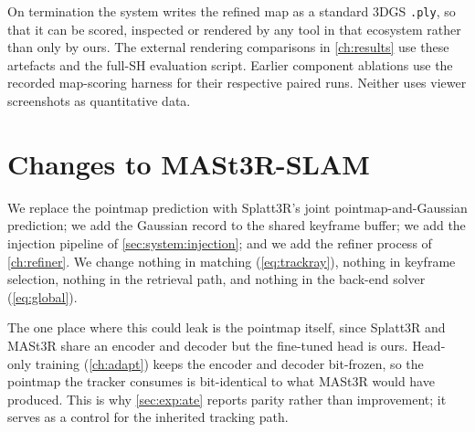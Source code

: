 On termination the system writes the refined map as a standard 3DGS
\texttt{.ply}, so that it can be scored, inspected or rendered by any tool in
that ecosystem rather than only by ours. The external rendering comparisons
in \cref{ch:results} use these artefacts and the full-SH evaluation script.
Earlier component ablations use the recorded map-scoring harness for their
respective paired runs. Neither uses viewer screenshots as quantitative data.

\section{Changes to MASt3R-SLAM}
\label{sec:system:diff}

We replace the pointmap
prediction with Splatt3R's joint pointmap-and-Gaussian prediction; we add the
Gaussian record to the shared keyframe buffer; we add the injection pipeline
of \cref{sec:system:injection}; and we add the refiner process of
\cref{ch:refiner}. We change nothing in matching (\cref{eq:trackray}), nothing
in keyframe selection, nothing in the retrieval path, and nothing in the
back-end solver (\cref{eq:global}).

The one place where this could leak is the pointmap itself, since Splatt3R and
MASt3R share an encoder and decoder but the fine-tuned head is ours. Head-only
training (\cref{ch:adapt}) keeps the encoder and decoder bit-frozen, so the
pointmap the tracker consumes is bit-identical to what MASt3R would have
produced. This is why \cref{sec:exp:ate} reports parity rather than
improvement; it serves as a control for the inherited tracking path.
